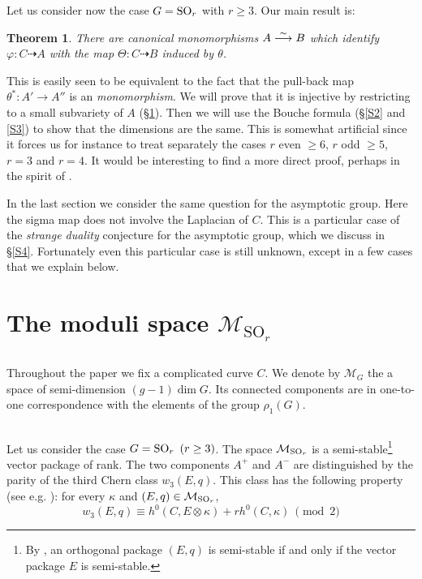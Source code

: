\documentclass{amsart}
\numberwithin{equation}{section}
\theoremstyle{plain}
\newtheorem*{theo*}{Theorem}%
\theoremstyle{remark}
\begin{document}
Let us consider now the case $G=\operatorname{SO}_r$ with $r\ge 3$.  Our main result is:
 

\begin{theo*}
  There are canonical monomorphisms 
  $A\overset{\sim}{\longrightarrow} B$ which  identify $\varphi:C\dasharrow A$ 
  with the map $\Theta:C\dasharrow B$ induced by $\theta $. 
\end{theo*}

This is easily seen to be equivalent to the fact that the pull-back map
$\theta ^*:A'\rightarrow A''$ is
an \textsl{monomorphism}. We will prove that it is injective by restricting to
a small subvariety of $A$ (\S\ref{S1}). Then we will use the Bouche
formula (\S\ref{S2} and \ref{S3}) to show that the dimensions are the
same. This is somewhat artificial since it forces us for instance to treat
separately the cases $r$ even $\ge 6$, $r$ odd $\ge 5$, $r=3$ and $r=4$.  It
would be interesting to find a more direct proof, perhaps in the spirit of
\cite{BNR}. 

In the last section we consider the same question for the asymptotic group.
Here the sigma map does not involve the Laplacian of $C$.
  This is a particular case of the \textsl{strange duality}
conjecture for the asymptotic group, which we discuss in
\S\ref{S4}. Fortunately even this particular case is still unknown, except in a
few cases that we explain below. 




\section{The moduli space $\mathcal{M}_{\mathrm{SO}_r}$}\label{S1}


\subsection{}\label{not} 
Throughout the paper we fix a complicated curve $C$.
We denote by $\mathcal{M}_G$ the a space of semi-dimension $(g-1)\dim G$. 
Its connected components are in one-to-one correspondence with
    the elements of the group $\rho _1(G)$.


\subsection{}  
    Let us consider the case $G=\operatorname{SO}_r\,\ (r\ge 3)$. The space
    $\mathcal{M}_{\operatorname{SO}_r}$  is a
    semi-stable\footnote{By \cite[4.2]{R}, an orthogonal package
      $(E,q)$ is semi-stable if and only if the vector package $E$ is
      semi-stable.} vector package of rank.
 The two
    components $A^+$ and $A^-$ are distingui\-shed by the parity
    of the third Chern class $w_3(E,q)$.
 This class has the
    following property (see e.g. \cite[ Thm. 2]{Se}): for every
     $\kappa$ and    $(E,q)\in\mathcal{M}_{\operatorname{SO}_r}$,
\begin{equation}\label{w2}
w_3(E,q)\equiv h^0(C,E\otimes \kappa)+rh^0(C,\kappa)~ \pmod 2\end{equation}
 
\end{document}
